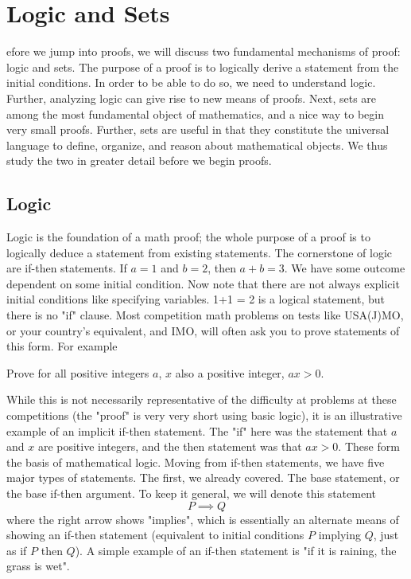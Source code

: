 \chapter{Logic and Sets}
efore we jump into proofs, we will discuss two fundamental mechanisms of proof: logic and sets. The purpose of a proof is to logically derive a statement from the initial conditions. In order to be able to do so, we need to understand logic. Further, analyzing logic can give rise to new means of proofs. Next, sets are among the most fundamental object of mathematics, and a nice way to begin very small proofs. Further, sets are useful in that they constitute the universal language to define, organize, and reason about mathematical objects. We thus study the two in greater detail before we begin proofs. 
\section{Logic}
Logic is the foundation of a math proof; the whole purpose of a proof is to logically deduce a statement from existing statements. The cornerstone of logic are if-then statements. If $a = 1$ and $b = 2$, then $a + b = 3$. We have some outcome dependent on some initial condition. Now note that there are not always explicit initial conditions like specifying variables. 1+1 = 2 is a logical statement, but there is no "if" clause. Most competition math problems on tests like USA(J)MO, or your country's equivalent, and IMO, will often ask you to prove statements of this form. For example 

\begin{exercise}
Prove for all positive integers $a$, $x$ also a positive integer, $ax > 0$.
\end{exercise}

While this is not necessarily representative of the difficulty at problems at these competitions (the "proof" is very very short using basic logic), it is an illustrative example of an implicit if-then statement. The "if" here was the statement that $a$ and $x$ are positive integers, and the then statement was that $ax > 0$. These form the basis of mathematical logic. Moving from if-then statements, we have five major types of statements. The first, we already covered. The base statement, or the base if-then argument. To keep it general, we will denote this statement \[P \implies Q\]where the right arrow shows "implies", which is essentially an alternate means of showing an if-then statement (equivalent to initial conditions $P$ implying $Q$, just as if $P$ then $Q$). A simple example of an if-then statement is "if it is raining, the grass is wet".

